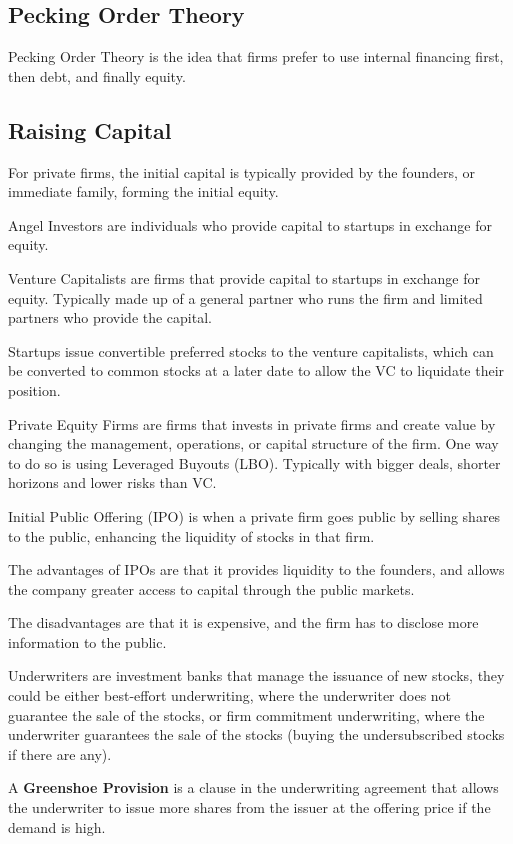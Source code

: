 \subsection{Pecking Order Theory}
Pecking Order Theory is the idea that firms prefer to use internal financing first, 
then debt, and finally equity.

\subsection{Raising Capital}
For private firms, the initial capital is typically provided by the founders, 
or immediate family, forming the initial equity.

Angel Investors are individuals who provide capital to startups in exchange for 
equity.

Venture Capitalists are firms that provide capital to startups in 
exchange for equity. Typically made up of a general partner who runs the firm and limited 
partners who provide the capital.

Startups issue convertible preferred stocks to the venture capitalists, 
which can be converted to common stocks at a later date to allow the VC to liquidate their position.

Private Equity Firms are firms that invests in private firms and create value
by changing the management, operations, or capital structure of the firm. One way to do so is using Leveraged Buyouts (LBO).
Typically with bigger deals, shorter horizons and lower risks than VC.

Initial Public Offering (IPO) is when a private firm goes public by selling shares 
to the public, enhancing the liquidity of stocks in that firm.

The advantages of IPOs are that it provides liquidity to the founders, and allows the company
greater access to capital through the public markets.

The disadvantages are that it is expensive, and the firm has to disclose more 
information to the public.

Underwriters are investment banks that manage the issuance of new stocks,
they could be either best-effort underwriting, where the underwriter does not 
guarantee the sale of the stocks, or firm commitment underwriting, 
where the underwriter guarantees the sale of the stocks (buying the undersubscribed stocks if there are any).

\begin{callout}
A \textbf{Greenshoe Provision} is a clause in the underwriting agreement that allows the 
underwriter to issue more shares from the issuer at the offering price if the 
demand is high.
\end{callout}

